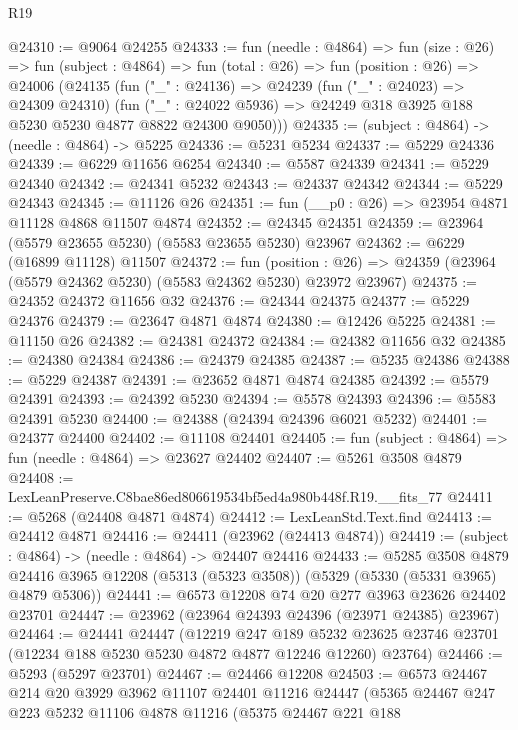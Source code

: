 \begin{lexlean}{R19}
\begin{coremodule}
@24310 := @9064 @24255
@24333 := fun (needle : @4864) =>
  fun (size : @26) =>
  fun (subject : @4864) =>
  fun (total : @26) =>
  fun (position : @26) =>
  @24006
    (@24135
      (fun ("_" : @24136) =>
      @24239
        (fun ("_" : @24023) => @24309 @24310)
        (fun ("_" : @24022 @5936) => @24249 @318 @3925 @188 @5230 @5230 @4877 @8822 @24300 @9050)))
@24335 := (subject : @4864) -> (needle : @4864) -> @5225
@24336 := @5231 @5234
@24337 := @5229 @24336
@24339 := @6229 @11656 @6254
@24340 := @5587 @24339
@24341 := @5229 @24340
@24342 := @24341 @5232
@24343 := @24337 @24342
@24344 := @5229 @24343
@24345 := @11126 @26
@24351 := fun (__p0 : @26) => @23954 @4871 @11128 @4868 @11507 @4874
@24352 := @24345 @24351
@24359 := @23964 (@5579 @23655 @5230) (@5583 @23655 @5230) @23967
@24362 := @6229 (@16899 @11128) @11507
@24372 := fun (position : @26) =>
  @24359 (@23964 (@5579 @24362 @5230) (@5583 @24362 @5230) @23972 @23967)
@24375 := @24352 @24372 @11656 @32
@24376 := @24344 @24375
@24377 := @5229 @24376
@24379 := @23647 @4871 @4874
@24380 := @12426 @5225
@24381 := @11150 @26
@24382 := @24381 @24372
@24384 := @24382 @11656 @32
@24385 := @24380 @24384
@24386 := @24379 @24385
@24387 := @5235 @24386
@24388 := @5229 @24387
@24391 := @23652 @4871 @4874 @24385
@24392 := @5579 @24391
@24393 := @24392 @5230
@24394 := @5578 @24393
@24396 := @5583 @24391 @5230
@24400 := @24388 (@24394 @24396 @6021 @5232)
@24401 := @24377 @24400
@24402 := @11108 @24401
@24405 := fun (subject : @4864) => fun (needle : @4864) => @23627 @24402
@24407 := @5261 @3508 @4879
@24408 := LexLeanPreserve.C8bae86ed806619534bf5ed4a980b448f.R19.__fits_77
@24411 := @5268 (@24408 @4871 @4874)
@24412 := LexLeanStd.Text.find
@24413 := @24412 @4871
@24416 := @24411 (@23962 (@24413 @4874))
@24419 := (subject : @4864) -> (needle : @4864) -> @24407 @24416
@24433 := @5285
    @3508
    @4879
    @24416
    @3965
    @12208
    (@5313 (@5323 @3508))
    (@5329 (@5330 (@5331 @3965) @4879 @5306))
@24441 := @6573 @12208 @74 @20 @277 @3963 @23626 @24402 @23701
@24447 := @23962 (@23964 @24393 @24396 (@23971 @24385) @23967)
@24464 := @24441
    @24447
    (@12219
      @247
      @189
      @5232
      @23625
      @23746
      @23701
      (@12234 @188 @5230 @5230 @4872 @4877 @12246 @12260)
      @23764)
@24466 := @5293 (@5297 @23701)
@24467 := @24466 @12208
@24503 := @6573
    @24467
    @214
    @20
    @3929
    @3962
    @11107
    @24401
    @11216
    @24447
    (@5365
      @24467
      @247
      @223
      @5232
      @11106
      @4878
      @11216
      (@5375
        @24467
        @221
        @188

\end{coremodule}
\end{lexlean}
